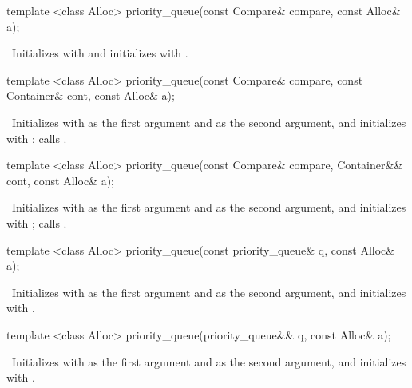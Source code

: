 \begin{itemdecl}
template <class Alloc> priority_queue(const Compare& compare, const Alloc& a);
\end{itemdecl}

\begin{itemdescr}
\pnum
\effects\ Initializes  with  and initializes  with .
\end{itemdescr}

\begin{itemdecl}
template <class Alloc>
  priority_queue(const Compare& compare, const Container& cont, const Alloc& a);
\end{itemdecl}

\begin{itemdescr}
\pnum
\effects\ Initializes  with  as the first argument and  as the second
argument, and initializes  with ;
calls .
\end{itemdescr}

\begin{itemdecl}
template <class Alloc>
  priority_queue(const Compare& compare, Container&& cont, const Alloc& a);
\end{itemdecl}

\begin{itemdescr}
\pnum
\effects\ Initializes  with  as the first argument and 
as the second argument, and initializes  with ;
calls .
\end{itemdescr}

\begin{itemdecl}
template <class Alloc> priority_queue(const priority_queue& q, const Alloc& a);
\end{itemdecl}

\begin{itemdescr}
\pnum
\effects\ Initializes  with  as the first argument and  as
the second argument, and initializes  with .
\end{itemdescr}

\begin{itemdecl}
template <class Alloc> priority_queue(priority_queue&& q, const Alloc& a);
\end{itemdecl}

\begin{itemdescr}
\pnum
\effects\ Initializes  with  as the first argument and 
as the second argument, and initializes  with .
\end{itemdescr}


